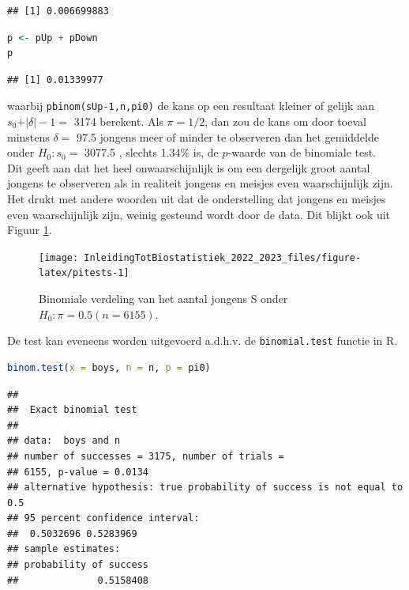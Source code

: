 \documentclass[
  12pt,dutch,coursenotes]{book}
\newcommand{\passthrough}[1]{#1}
\begin{document}
\begin{lstlisting}
## [1] 0.006699883
\end{lstlisting}

\begin{lstlisting}[language=R]
p <- pUp + pDown
p
\end{lstlisting}

\begin{lstlisting}
## [1] 0.01339977
\end{lstlisting}

waarbij \passthrough{\lstinline!pbinom(sUp-1,n,pi0)!} de kans op een resultaat kleiner of gelijk aan \(s_0+\vert \delta\vert -1 =\) 3174 berekent.
Als \(\pi= 1/2\), dan zou de kans om door toeval minstens \(\delta=\) 97.5 jongens meer of minder te observeren dan het gemiddelde onder \(H_0: s_0=\) 3077.5 , slechts 1.34\% is, de \(p\)-waarde van de binomiale test.\\
Dit geeft aan dat het heel onwaarschijnlijk is om een dergelijk groot aantal jongens te
observeren als in realiteit jongens en meisjes even waarschijnlijk zijn.
Het drukt
met andere woorden uit dat de onderstelling dat jongens en meisjes even waarschijnlijk zijn, weinig gesteund wordt door de data.
Dit blijkt ook uit Figuur \ref{fig:pitests}.

\begin{figure}

{\centering \texttt{[image: InleidingTotBiostatistiek\_2022\_2023\_files/figure-latex/pitests-1]} 

}

\caption{Binomiale verdeling van het aantal jongens S onder $H_0: \pi=0.5 (n=6155)$.}\label{fig:pitests}
\end{figure}

De test kan eveneens worden uitgevoerd a.d.h.v. de \passthrough{\lstinline!binomial.test!} functie in R.

\begin{lstlisting}[language=R]
binom.test(x = boys, n = n, p = pi0)
\end{lstlisting}

\begin{lstlisting}
## 
##  Exact binomial test
## 
## data:  boys and n
## number of successes = 3175, number of trials =
## 6155, p-value = 0.0134
## alternative hypothesis: true probability of success is not equal to 0.5
## 95 percent confidence interval:
##  0.5032696 0.5283969
## sample estimates:
## probability of success 
##              0.5158408
\end{lstlisting}
\end{document}
